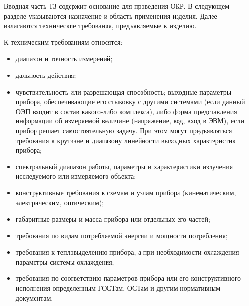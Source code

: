Вводная часть ТЗ содержит основание для проведения ОКР. В следующем разделе указываются назначение и область применения изделия. Далее излагаются технические требования, предъявляемые к изделию.

К техническим требованиям относятся:
\begin{itemize}
	\item диапазон и точность измерений; 
	\item дальность действия;
	\item чувствительность или разрешающая способность; выходные параметры прибора, обеспечивающие его стыковку с другими системами (если данный ОЭП входит в состав какого-либо комплекса), либо форма представления информации об измеряемой величине (напряжение, код, вход в ЭВМ), если прибор решает самостоятельную задачу. При этом могут предъявляться требования к крутизне и диапазону линейности выходных характеристик прибора;
	\item спектральный диапазон работы, параметры и характеристики излучения исследуемого или измеряемого объекта;
	\item конструктивные требования к схемам и узлам прибора (кинематическим, электрическим, оптическим);
	\item габаритные размеры и масса прибора или отдельных его частей;
	\item требования по видам потребляемой энергии и мощности потребления;
	\item требования к тепловыделению прибора, а при необходимости охлаждения -- параметры системы охлаждения;
	\item требования по соответствию параметров прибора или его конструктивного исполнения определенным ГОСТам, ОСТам и другим нормативным документам.
\end{itemize}

